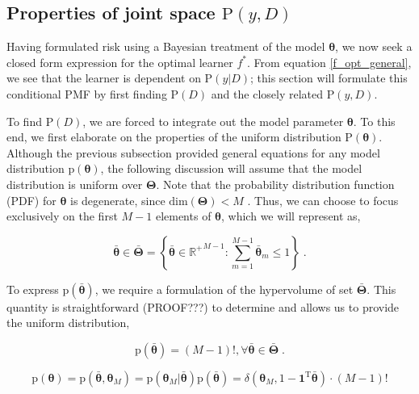 \documentclass[12pt]{article}
\begin{document}
\subsection{Properties of joint space $\text{P}(y,D)$}

Having formulated risk using a Bayesian treatment of the model $\bm{\theta}$, we now seek a closed form expression for the optimal learner $f^*$. From equation \eqref{f_opt_general}, we see that the learner is dependent on $\text{P}(y|D)$; this section will formulate this conditional PMF by first finding $\text{P}(D)$ and the closely related $\text{P}(y,D)$.


To find $\text{P}(D)$, we are forced to integrate out the model parameter $\bm{\theta}$. To this end, we first elaborate on the properties of the uniform distribution $\text{P}(\bm{\theta})$. Although the previous subsection provided general equations for any model distribution $\text{p}(\bm{\theta})$, the following discussion will assume that the model distribution is uniform over $\bm{\Theta}$. Note that the probability distribution function (PDF) for $\bm{\theta}$ is degenerate, since $\text{dim}(\bm{\Theta}) < M$ . Thus, we can choose to focus exclusively on the first $M-1$ elements of $\bm{\theta}$, which we will represent as,

\begin{equation}
\bar{\bm{\theta}} \in \bar{\bm{\Theta}} = \left\{ \bar{\bm{\theta}} \in {\mathbb{R}^+}^{M-1}: \sum_{m=1}^{M-1} \bar{\bm{\theta}}_m \leq 1 \right\} \;.
\end{equation}

To express $\text{p}\left(\bar{\bm{\theta}}\right)$, we require a formulation of the hypervolume of set $\bar{\bm{\Theta}}$. This quantity is straightforward (PROOF???) to determine and allows us to provide the uniform distribution,

\begin{equation}
\text{p}\left(\bar{\bm{\theta}}\right)= (M-1)!,  \forall \bar{\bm{\theta}} \in \bar{\bm{\Theta}} \;.
\end{equation}

\begin{equation}
\text{p}(\bm{\theta}) = \text{p}(\bar{\bm{\theta}},\bm{\theta}_M) = \text{p}\left( \bm{\theta}_M | \bar{\bm{\theta}} \right) \text{p}\left(\bar{\bm{\theta}}\right)
= \delta\left( \bm{\theta}_M,1-\bm{1}^\text{T}\bar{\bm{\theta}} \right) \cdot  (M-1)!
\end{equation}
\end{document}
